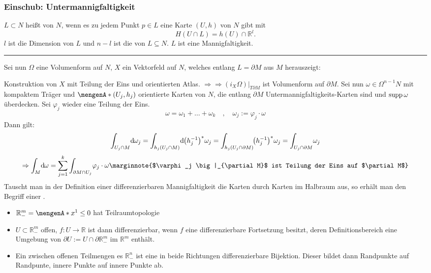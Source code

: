 \subsubsection{Einschub: Untermannigfaltigkeit} %
\label{ssub:611}
$L \subset N$ heißt  von $N$, wenn es zu jedem Punkt $p \in L$ eine Karte $(U,h)$ von $N$ gibt mit 
\[
	H(U \cap L) = h(U) \cap \mathds{R}^l.
\] 
$l$ ist die Dimension von $L$ und $n-l$ ist die  von $L \subseteq N$. $L$ ist eine Mannigfaltigkeit.
\hrule \bigskip
Sei nun $\Omega$ eine Volumenform auf $N$, $X$ ein Vektorfeld auf $N$, welches entlang $L= \partial M$ aus $M$ herauszeigt:

Konstruktion von $X$ mit Teilung der Eins und orientierten Atlas. $\Rightarrow \Rightarrow (i_X \Omega) \big|_{T \partial M}$ ist Volumenform auf $\partial M$.
Sei nun $\omega \in \Omega^{n-1} N$ mit kompaktem Träger und $\set{(U_j, h_j)} $ orientierte Karten von $N$, die entlang $\partial M$ Untermannigfaltigkeits-Karten sind 
und $\operatorname{supp} \omega$ überdecken. Sei $\varphi_j$ wieder eine Teilung der Eins.
\[
	\omega = \omega_1 + \ldots + \omega_k \quad , \quad \omega_j := \varphi_j \cdot \omega
\]
Dann gilt:
\[
	 \int_{U_j \cap M} \! \mathd \omega_j = \int_{h_j(U_j \cap M)} \! \mathd \enbrace*{h_j ^{-1}}^* \omega_j 
	 = \int_{h_j(U_j \cap \partial M)} \! \enbrace*{h_j ^{-1}}^* \omega_j  = \int_{U_j \cap \partial M} \!  \omega_j
\]
\[
	\Rightarrow \int_{M} \! \mathd \omega = \sum_{j=1}^{k} \int_{\partial M \cap U_j} \! \varphi_j \cdot \omega	
	\marginnote{$\varphi_j \big|_{\partial M}$ ist Teilung der Eins auf $\partial M$}
\]
Tauscht man in der Definition einer differenzierbaren Mannigfaltigkeit die Karten durch Karten im Halbraum aus, so erhält man den Begriff einer 
.
\begin{itemize}
	\item $\mathds{R}^m_- = \set{x^1 \le 0} $ hat Teilraumtopologie
	\item $U \subset \mathds{R}^m_-$ offen, $f : U \to \mathds{R}$ ist dann differenzierbar, wenn $f$ eine differenzierbare Fortsetzung besitzt, deren Definitionsbereich
	eine Umgebung von $\partial U := U \cap \partial \mathds{R}^m_-$ im $\mathds{R}^m$ enthält.
	\item Ein  zwischen offenen Teilmengen es $\mathds{R}^n_-$ ist eine in beide Richtungen differenzierbare Bijektion. Dieser bildet dann Randpunkte
	auf Randpunte, innere Punkte auf innere Punkte ab.
\end{itemize}
